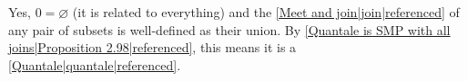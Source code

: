 Yes, $0=\varnothing$ (it is related to everything) and the \ref{Meet and join|join|referenced} of any pair of subsets is well-defined as their union.  By \ref{Quantale is SMP with all joins|Proposition 2.98|referenced}, this means it is a \ref{Quantale|quantale|referenced}.
